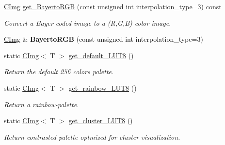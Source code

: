 \begin{DoxyCompactItemize}
\item 
\hypertarget{structcimg__library_1_1_c_img_a3eba184952b80d63385a5ab704346e70}{\hyperlink{structcimg__library_1_1_c_img}{C\-Img} \hyperlink{structcimg__library_1_1_c_img_a3eba184952b80d63385a5ab704346e70}{get\-\_\-\-Bayerto\-R\-G\-B} (const unsigned int interpolation\-\_\-type=3) const }\label{structcimg__library_1_1_c_img_a3eba184952b80d63385a5ab704346e70}

\begin{DoxyCompactList}\small\item\em Convert a Bayer-\/coded image to a (R,G,B) color image. \end{DoxyCompactList}\item 
\hypertarget{structcimg__library_1_1_c_img_a39d1eece703108eab0fecdc99dcf41c9}{\hyperlink{structcimg__library_1_1_c_img}{C\-Img} \& {\bfseries Bayerto\-R\-G\-B} (const unsigned int interpolation\-\_\-type=3)}\label{structcimg__library_1_1_c_img_a39d1eece703108eab0fecdc99dcf41c9}

\item 
static \hyperlink{structcimg__library_1_1_c_img}{C\-Img}$<$ T $>$ \hyperlink{structcimg__library_1_1_c_img_a34d519a14c0aed27660fb42d25bf5f74}{get\-\_\-default\-\_\-\-L\-U\-T8} ()
\begin{DoxyCompactList}\small\item\em Return the default 256 colors palette. \end{DoxyCompactList}\item 
\hypertarget{structcimg__library_1_1_c_img_a2dda7b2de096fc4b9871f0cb732e510c}{static \hyperlink{structcimg__library_1_1_c_img}{C\-Img}$<$ T $>$ \hyperlink{structcimg__library_1_1_c_img_a2dda7b2de096fc4b9871f0cb732e510c}{get\-\_\-rainbow\-\_\-\-L\-U\-T8} ()}\label{structcimg__library_1_1_c_img_a2dda7b2de096fc4b9871f0cb732e510c}

\begin{DoxyCompactList}\small\item\em Return a rainbow-\/palette. \end{DoxyCompactList}\item 
\hypertarget{structcimg__library_1_1_c_img_a6a56877c2e712e15e5da590ae8f520f2}{static \hyperlink{structcimg__library_1_1_c_img}{C\-Img}$<$ T $>$ \hyperlink{structcimg__library_1_1_c_img_a6a56877c2e712e15e5da590ae8f520f2}{get\-\_\-cluster\-\_\-\-L\-U\-T8} ()}\label{structcimg__library_1_1_c_img_a6a56877c2e712e15e5da590ae8f520f2}

\begin{DoxyCompactList}\small\item\em Return contrasted palette optmized for cluster visualization. \end{DoxyCompactList}\end{DoxyCompactItemize}
